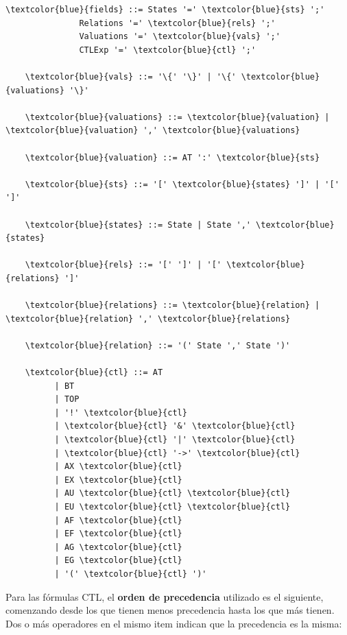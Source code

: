 \documentclass[11pt]{article}
\begin{document}
  \begin{Verbatim}[commandchars=\\\{\}]
    \textcolor{blue}{fields} ::= States '=' \textcolor{blue}{sts} ';' 
               Relations '=' \textcolor{blue}{rels} ';'
               Valuations '=' \textcolor{blue}{vals} ';'
               CTLExp '=' \textcolor{blue}{ctl} ';'

    \textcolor{blue}{vals} ::= '\{' '\}' | '\{' \textcolor{blue}{valuations} '\}'

    \textcolor{blue}{valuations} ::= \textcolor{blue}{valuation} | \textcolor{blue}{valuation} ',' \textcolor{blue}{valuations}

    \textcolor{blue}{valuation} ::= AT ':' \textcolor{blue}{sts}
    
    \textcolor{blue}{sts} ::= '[' \textcolor{blue}{states} ']' | '[' ']'

    \textcolor{blue}{states} ::= State | State ',' \textcolor{blue}{states}

    \textcolor{blue}{rels} ::= '[' ']' | '[' \textcolor{blue}{relations} ']'

    \textcolor{blue}{relations} ::= \textcolor{blue}{relation} | \textcolor{blue}{relation} ',' \textcolor{blue}{relations}

    \textcolor{blue}{relation} ::= '(' State ',' State ')'

    \textcolor{blue}{ctl} ::= AT                        
          | BT                        
          | TOP                       
          | '!' \textcolor{blue}{ctl}                  
          | \textcolor{blue}{ctl} '&' \textcolor{blue}{ctl}               
          | \textcolor{blue}{ctl} '|' \textcolor{blue}{ctl}              
          | \textcolor{blue}{ctl} '->' \textcolor{blue}{ctl}              
          | AX \textcolor{blue}{ctl}                     
          | EX \textcolor{blue}{ctl}                     
          | AU \textcolor{blue}{ctl} \textcolor{blue}{ctl}                 
          | EU \textcolor{blue}{ctl} \textcolor{blue}{ctl}                 
          | AF \textcolor{blue}{ctl}                     
          | EF \textcolor{blue}{ctl}                     
          | AG \textcolor{blue}{ctl}                     
          | EG \textcolor{blue}{ctl}                     
          | '(' \textcolor{blue}{ctl} ')'               

  \end{Verbatim}

  Para las fórmulas CTL, el \textbf{orden de precedencia} utilizado es el siguiente,
  comenzando desde los que tienen menos precedencia hasta los que más tienen.
  Dos o más operadores en el mismo item indican que la precedencia es la misma:
\end{document}
